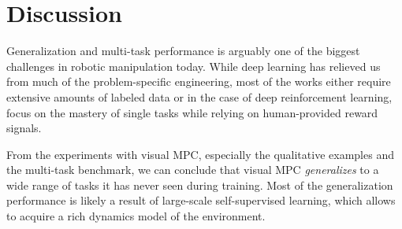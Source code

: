 \section{Discussion}
Generalization and multi-task performance is arguably one of the biggest challenges in robotic manipulation today. While deep learning has relieved us from much of the problem-specific engineering, most of the works either require extensive amounts of labeled data or in the case of deep reinforcement learning, focus on the mastery of single tasks while relying on human-provided reward signals. 

From the experiments with visual MPC, especially the qualitative examples and the multi-task benchmark, we can conclude that visual MPC \emph{generalizes} to a wide range of tasks it has never seen during training. Most of the generalization performance is likely a result of large-scale self-supervised learning, which allows to acquire a rich dynamics model of the environment. 


